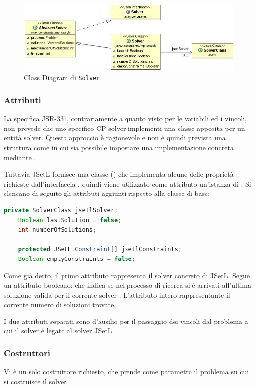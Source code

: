 \begin{figure}[!ht]\label{solverUML}
\centering
\includegraphics[scale=.5]{img/Solver.JPG}
\caption{Class Diagram di \texttt{Solver}.}
\end{figure}

\subsubsection{Attributi}
La specifica JSR-331, contrariamente a
quanto visto per le variabili ed i vincoli, non prevede che uno specifico
CP solver implementi una classe apposita per un entità solver. Questo 
approccio è ragionevole e non è quindi prevista una struttura come 
 in cui sia possibile impostare una implementazione concreta
mediante .

Tuttavia JSetL fornisce una classe () che implementa 
alcune delle proprietà richieste dall'interfaccia , quindi  viene
utilizzato come attributo  un'istanza di .
Si elencano di seguito gli attributi aggiunti rispetto alla classe di base:

\begin{lstlisting}[language = Java,
                   caption = {attributi di Solver.}]
	private SolverClass jsetlSolver;
	Boolean lastSolution = false;
	int numberOfSolutions;

	protected JSetL.Constraint[] jsetlConstraints;
	Boolean emptyConstraints = false;
\end{lstlisting}
Come già detto, il primo attributo rappresenta il solver concreto di JSetL.
Segue un attributo booleano:  che
indica se nel processo di ricerca si è arrivati all'ultima soluzione valida
per il corrente solver . L'attributo
intero rappresentante il corrente numero di soluzioni trovate.

I due attributi separati sono d'ausilio per il passaggio dei vincoli dal
problema a cui il solver è legato al solver JSetL.

\subsubsection{Costruttori}
Vi è un solo costruttore richiesto, che prende come parametro il problema su
cui si costruisce il solver.

